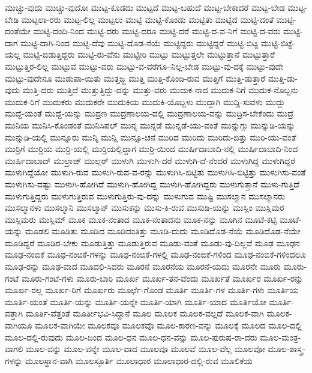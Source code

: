 {ಮುಚ್ಚು-ವುದು
ಮುಚ್ಚು-ವುದೋ
ಮುಟ್ಟ-ಕೂಡದು
ಮುಟ್ಟದೆ
ಮುಟ್ಟ-ಬಹುದೆ
ಮುಟ್ಟ-ಬೇಕಾದರೆ
ಮುಟ್ಟ-ಬೇಡ
ಮುಟ್ಟ-ಬೇಡಿ
ಮುಟ್ಟಲಾ-ರರು
ಮುಟ್ಟ-ಲಿಲ್ಲ
ಮುಟ್ಟಲು
ಮುಟ್ಟಿ
ಮುಟ್ಟಿ-ಕೊಂಡು
ಮುಟ್ಟಿತು
ಮುಟ್ಟಿದ
ಮುಟ್ಟಿ-ದಂತೆ
ಮುಟ್ಟಿ-ದಂತೆಯೇ
ಮುಟ್ಟಿ-ದಂದಿ-ನಿಂದ
ಮುಟ್ಟಿ-ದರು
ಮುಟ್ಟಿ-ದರೂ
ಮುಟ್ಟಿ-ದರೆ
ಮುಟ್ಟಿ-ದ-ವ-ನಿಗೆ
ಮುಟ್ಟಿ-ದ-ವರು
ಮುಟ್ಟಿ-ದಾಗ
ಮುಟ್ಟಿ-ದಾಗಿ-ನಿಂದ
ಮುಟ್ಟಿ-ದೆವು
ಮುಟ್ಟಿ-ದೊಡ-ನೆಯೆ
ಮುಟ್ಟಿದ್ದರು
ಮುಟ್ಟಿದ್ದರೆ
ಮುಟ್ಟಿ-ಬಿಟ್ಟ
ಮುಟ್ಟಿ-ಬಿಟ್ಟೆ-ಯಲ್ಲ
ಮುಟ್ಟಿ-ಬಿಡುತ್ತಿದ್ದರು
ಮುಟ್ಟಿ-ರು-ವೆನು
ಮುಟ್ಟೀರಿ
ಮುಟ್ಟು
ಮುಟ್ಟುತ್ತಲೇ
ಮುಟ್ಟುತ್ತಾನೆ
ಮುಟ್ಟುತ್ತಾರೆ
ಮುಟ್ಟುತ್ತಿರ-ಲಿಲ್ಲ
ಮುಟ್ಟುವ
ಮುಟ್ಟು-ವರು
ಮುಟ್ಟು-ವ-ವರೆಗೂ--ನಿಲ್ಲ-ಬೇಡ
ಮುಟ್ಟು-ವು-ದಕ್ಕೆ
ಮುಟ್ಟು-ವುದೇ
ಮುಟ್ಟು-ವುದೇನೂ
ಮುಡುಪಾ-ಯಿತು
ಮುತ್ತಜ್ಜ
ಮುತ್ತಿ
ಮುತ್ತಿ-ಕೊಂಡಿ-ರುವ
ಮುತ್ತಿಗೆ
ಮುತ್ತಿ-ಡುತ್ತಾರೆ
ಮುತ್ತಿ-ಡು-ವುದು
ಮುತ್ತಿ-ದರು
ಮುತ್ತಿದೆ
ಮುತ್ತುತ್ತಿದ್ದು-ದನ್ನು
ಮುತ್ತು-ವರು
ಮುದುಕ-ನಾದ
ಮುದುಕ-ನಿಗೆ
ಮುದುಕ-ನೊಬ್ಬನು
ಮುದುಕ-ರಿಗೆ
ಮುದುಕರು
ಮುದುಕರೇ
ಮುದುಕಿಯ
ಮುದುಕಿ-ಯೊಬ್ಬಳು
ಮುದ್ದಾಗಿ
ಮುದ್ದಿ-ಸುವಳು
ಮುದ್ದು
ಮುದ್ದೆ-ಯಂತೆ
ಮುದ್ದೆ-ಯನ್ನು
ಮುದ್ರಣ
ಮುದ್ರಣಾಲಯ-ದಲ್ಲಿ
ಮುದ್ರಣಾಲಯ-ವನ್ನು
ಮುದ್ರಿಸ-ಬೇಕೆಂದು
ಮುದ್ರೆ
ಮುನಿಯ
ಮುನಿಸಿ-ಕೊಂಡಂತೆ
ಮುನಿಸಿಪಲ್
ಮುನ್ನ
ಮುನ್ನಡೆ
ಮುನ್ನಡೆ-ಯು-ವಂತೆ
ಮುನ್ನುಗ್ಗು
ಮುನ್ನುಡಿ-ಯನ್ನು
ಮುನ್ನುಡಿ-ಯಲ್ಲಿ
ಮುನ್ನೂರು
ಮುನ್ಶಿ
ಮುನ್ಷಿ
ಮುನ್ಸೂ-ಚನೆ
ಮುರಿದ
ಮುರಿದು
ಮುರಿದು-ಬಿತ್ತು
ಮುರಿ-ಯು-ವಂತೆ
ಮುರ್ರಿಗೆ
ಮುರ್ರಿಯ
ಮುರ್ರಿ-ಯಲ್ಲಿ
ಮುರ್ರಿಯಲ್ಲಿದ್ದಾಗ
ಮುರ್ರಿ-ಯಿಂದ
ಮುರ್ಷಿದಾಬಾದಿ-ನಲ್ಲಿ
ಮುರ್ಷಿದಾಬಾದಿ-ನಿಂದ
ಮುರ್ಷಿದಾಬಾದ್
ಮುಲ್ರಾಜ್
ಮುಲ್ಲರ್
ಮುಳುಗಿ
ಮುಳುಗಿ-ದರೆ
ಮುಳುಗಿ-ದೆ-ನೆಂದರೆ
ಮುಳುಗಿದ್ದ
ಮುಳುಗಿದ್ದರೆ
ಮುಳುಗಿದ್ದೆಯೋ
ಮುಳುಗಿ-ರುವ
ಮುಳುಗಿ-ರುವ-ವ-ರನ್ನು
ಮುಳುಗಿಸಿ-ಬಿಟ್ಟಿತು
ಮುಳುಗಿಸಿ-ಬಿಟ್ಟಿತ್ತು
ಮುಳುಗಿಸು-ವಂತೆ
ಮುಳುಗಿಸು-ವಷ್ಟು
ಮುಳುಗಿ-ಹೋಗಿದೆ
ಮುಳುಗಿ-ಹೋಗಿದ್ದ
ಮುಳುಗಿ-ಹೋಗಿದ್ದರು
ಮುಳುಗುತ್ತಾನೆ
ಮುಳು-ಗುತ್ತಿದೆ
ಮುಳುಗುತ್ತಿದ್ದರು
ಮುಳುಗುತ್ತಿರುವ
ಮುಳುಗುತ್ತಿರು-ವು-ದನ್ನು
ಮುಳುಗುವ
ಮುಷ್ಟಿ
ಮುಸಲ್ಮಾನ
ಮುಸಲ್ಮಾನರು
ಮುಸಲ್ಮಾನಳು
ಮುಸಲ್ಮಾನಿ
ಮುಸಲ್ಮಾನ್
ಮುಸುಕನ್ನು
ಮುಸು-ಕಿ-ರುವ
ಮುಸುಡಿ-ಯನ್ನು
ಮುಸ್ಲಿಂ
ಮುಸ್ಲಿಮರ
ಮುಸ್ಲಿಮರು
ಮುಸ್ಲಿಮ್
ಮೂಕ
ಮೂಕ-ನಂತಾದ
ಮೂಕ-ನಂತಾದನು
ಮೂಕ-ನನ್ನು
ಮೂಗಿನ
ಮೂಟೆ-ಕಟ್ಟಿ
ಮೂಟೆ-ಯನ್ನು
ಮೂಡಲಿ
ಮೂಡಿತು
ಮೂಡಿದ
ಮೂಡಿದಂತಿತ್ತು
ಮೂಡಿ-ದುದು
ಮೂಡಿದೊಡ-ನೆಯೆ
ಮೂಡಿದೊಡ-ನೆಯೇ
ಮೂಡಿದ್ದರೆ
ಮೂಡಿರ-ಬೇಕು
ಮೂಡುತ್ತಿತ್ತು
ಮೂಡುತ್ತಿರುವ
ಮೂಡು-ವಂತೆ
ಮೂಡು-ವು-ದಿಲ್ಲವೆ
ಮೂಢ
ಮೂಢನ
ಮೂಢ-ನಂಬಿಕೆ
ಮೂಢ-ನಂಬಿಕೆ-ಗಳನ್ನು
ಮೂಢ-ನಂಬಿಕೆ-ಗಳಲ್ಲಿ
ಮೂಢ-ನಂಬಿಕೆ-ಗಳಿಂದ
ಮೂಢ-ನಂಬಿಕೆ-ಗಳಿಂದಲೂ
ಮೂಢ-ರನ್ನು
ಮೂಢ-ವಾದ
ಮೂದಲಿ-ಸಿದರು
ಮೂರನೆ
ಮೂರನೆಯ
ಮೂರನೆ-ಯದು
ಮೂರನೇ
ಮೂರು
ಮೂರು-ಗಂಟೆ
ಮೂರು-ಗಂಟೆ-ಗಳು
ಮೂರು-ಬಾರಿ
ಮೂರ್ಖ
ಮೂರ್ಖ-ತನ-ವೆಂದು
ಮೂರ್ಖತೆ
ಮೂರ್ಖರ
ಮೂರ್ಖ-ರನ್ನು
ಮೂರ್ಖ-ರಲ್ಲ
ಮೂರ್ಖ-ರಿಗೆ
ಮೂರ್ಖರು
ಮೂರ್ಛೆ-ಗೊಂಡ
ಮೂರ್ತಿ
ಮೂರ್ತಿ-ಗಳ
ಮೂರ್ತಿ-ಗಳು
ಮೂರ್ತಿಯ
ಮೂರ್ತಿ-ಯಂತೆ
ಮೂರ್ತಿ-ಯನ್ನು
ಮೂರ್ತಿ-ಯನ್ನೇ
ಮೂರ್ತಿ-ಯಾಗಿ
ಮೂರ್ತಿ-ಯಾದ
ಮೂರ್ತಿಯೋ
ಮೂರ್ತಿ-ವತ್ತಾಗಿ
ಮೂರ್ತಿ-ವೆತ್ತಂತೆ
ಮೂರ್ತೀಭವಿ-ಸಿದ್ದಾನೆ
ಮೂಲ
ಮೂಲಕ
ಮೂಲಕ-ವಲ್ಲದೆ
ಮೂಲಕ-ವಾಗಿ
ಮೂಲಕ-ವಾಗಿಯೂ
ಮೂಲಕ-ವಾಗಿಯೇ
ಮೂಲಕವೂ
ಮೂಲಕವೊ
ಮೂಲ-ಕಾರಣ-ವನ್ನು
ಮೂಲಕ್ಕೆ
ಮೂಲದ
ಮೂಲ-ದಲ್ಲಿ
ಮೂಲ-ದಲ್ಲಿ-ರುವುದು
ಮೂಲ-ದಿಂದ
ಮೂಲ-ಧನ
ಮೂಲ-ಧನ-ವನ್ನು
ಮೂಲ-ಪುರುಷ-ರಾ-ದರು
ಮೂಲ-ಮಂತ್ರ-ವಾಗಲಿ
ಮೂಲ-ವನ್ನು
ಮೂಲ-ವನ್ನೇ
ಮೂಲ-ವಾದ
ಮೂಲವೂ
ಮೂಲವೆ
ಮೂಲ-ವೆಲ್ಲ
ಮೂಲವೋ
ಮೂಲ-ಶಾಸ್ತ್ರ-ಗಳನ್ನು
ಮೂಲಸ್ಥಾನ-ವಾಗಿ
ಮೂಲಸ್ಫೂರ್ತಿ
ಮೂಲಾಧಾರ
ಮೂಲಾಧಾರ-ದಲ್ಲಿ-ರುವ
ಮೂಲಿಕೆಯ
}
